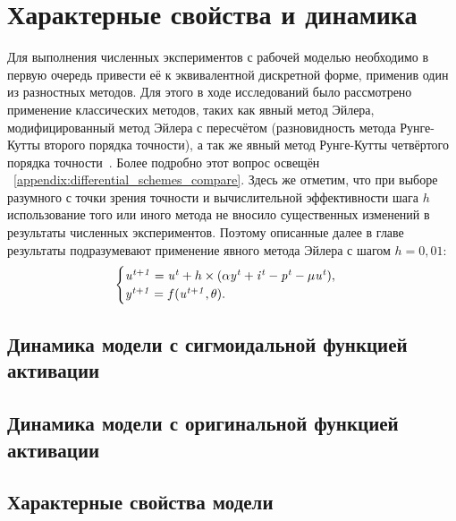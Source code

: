 \section{Характерные свойства и динамика} \label{section:neuron_dynamic}

Для выполнения численных экспериментов с рабочей моделью необходимо в первую очередь привести её к эквивалентной дискретной форме, применив один из разностных методов. Для этого в ходе исследований было рассмотрено применение классических методов, таких как явный метод Эйлера, модифицированный метод Эйлера с пересчётом (разновидность метода Рунге-Кутты второго порядка точности), а так же явный метод Рунге-Кутты четвёртого порядка точности~\cite{Hairer1990}. Более подробно этот вопрос освещён \inappendix~\ref{appendix:differential_schemes_compare}. Здесь же отметим, что при выборе разумного с точки зрения точности и вычислительной эффективности шага $h$ использование того или иного метода не вносило существенных изменений в результаты численных экспериментов. Поэтому описанные далее в главе результаты подразумевают применение явного метода Эйлера с шагом $h = 0,01$:
$$
    \begin{cases}
        \mathit{u^{t+1}} = \mathit{u^{t}} + h \times ( \alpha\mathit{y^{t}} + \mathit{i^{t}} - \mathit{p^{t}} - \mu\mathit{u^{t}} ), \\ 
        \mathit{y^{t+1}} = f(\mathit{u^{t+1}}, \theta).
    \end{cases}
$$


\subsection{Динамика модели с сигмоидальной функцией активации}

\subsection{Динамика модели с оригинальной функцией активации}

\subsection{Характерные свойства модели}


